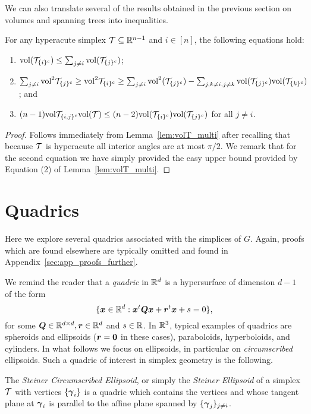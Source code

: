 We can also translate several of the results obtained in the previous section on  volumes and spanning  trees into inequalities. 

\begin{lemma}
\label{lem:volT_inequalities}
For any hyperacute simplex $\mathcal{T}\subseteq\mathbb{R}^{n-1}$ and  $i\in[n]$, the following equations hold:
\begin{enumerate}
	\item $\textnormal{vol}(\mathcal{T}_{\{i\}^c}) \leq \sum_{j\neq i}\textnormal{vol}(\mathcal{T}_{\{j\}^c})$;
	\item $\sum_{j\neq i}\textnormal{vol}^2\mathcal{T}_{\{j\}^c}\geq \textnormal{vol}^2\mathcal{T}_{\{i\}^c}\geq   \sum_{j\neq i}\textnormal{vol}^2(\mathcal{T}_{\{j\}^c}) - \sum_{j,k\neq i,j\neq k} \textnormal{vol}(\mathcal{T}_{\{j\}^c})\textnormal{vol}(\mathcal{T}_{\{k\}^c})$; and
	\item $(n-1)\textnormal{vol}\mathcal{T}_{\{i,j\}^c}\textnormal{vol}(\mathcal{T}) \leq  (n-2)\textnormal{vol}(\mathcal{T}_{\{i\}^c})\textnormal{vol}(\mathcal{T}_{\{j\}^c})$ for  all $j\neq i$.
\end{enumerate}
\end{lemma}
\begin{proof}
	Follows immediately from Lemma~\ref{lem:volT_multi} after  recalling that because $\mathcal{T}$  is  hyperacute all interior  angles are at most $\pi/2$. We remark that for the second  equation  we have simply provided the  easy  upper bound provided by Equation (2) of Lemma~\ref{lem:volT_multi}. 
\end{proof}



\section{Quadrics}
\label{sec:quadrics}

Here we explore several quadrics associated with the simplices of $G$. Again,  proofs which  are  found elsewhere are typically omitted and found in Appendix~\ref{sec:app_proofs_further}. 

We remind the reader that a  \emph{quadric} in $\mathbb{R}^d$ is a hypersurface of dimension $d-1$ of the form 
\begin{equation*}
\{\vb*{x}\in\mathbb{R}^d: \vb*{x}^t \vb*{Q}\vb*{x} + \vb*{r}^t \vb*{x} + s=0\},
\end{equation*}
for some $\vb*{Q}\in\mathbb{R}^{d\times d},\vb*{r}\in\mathbb{R}^d$  and $s\in \mathbb{R}$. 
In $\mathbb{R}^3$, typical examples of quadrics are spheroids and ellipsoids ($\vb*{r}=\vb{0}$ in these cases), paraboloids, hyperboloids, and  cylinders. In what follows we focus on ellipsoids, in particular on \emph{circumscribed} ellipsoids. Such a quadric of interest in simplex geometry is the following. 

\begin{definition}
\label{def:steiner_ellipsoid}
The \emph{Steiner Circumscribed Ellipsoid}, or simply the \emph{Steiner Ellipsoid} of a simplex $\mathcal{T}$ with vertices $\{\vb*{\gamma}_i\}$ is a quadric which contains the vertices and whose tangent plane at $\vb*{\gamma}_i$ is parallel to the affine plane spanned by $\{\vb*{\gamma}_j\}_{j\neq i}$. 
\end{definition}

